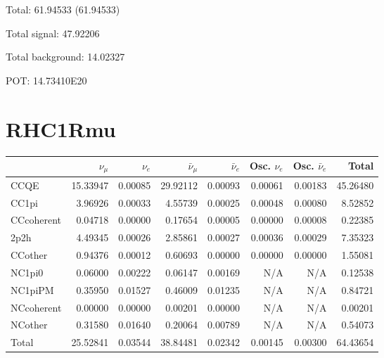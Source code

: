 \documentclass[10pt,a4paper]{article}
\begin{document}
Total: 61.94533    (61.94533)


Total signal: 47.92206


Total background: 14.02327

POT: 14.73410E20



\clearpage


\section*{RHC1Rmu}
\begin{tabular} { | l ||r | r | r | r | r | r | | r | }
\hline
              & $\nu_\mu$            & $\nu_e$              & $\bar{\nu}_{\mu}$    & $\bar{\nu}_{e}$      & Osc. $\nu_e$         & Osc. $\bar{\nu}_{e}$ & Total                \\ \hline\hline
 CCQE         & 15.33947             & 0.00085              & 29.92112             & 0.00093              & 0.00061              & 0.00183              & 45.26480             \\ \hline
 CC1pi        & 3.96926              & 0.00033              & 4.55739              & 0.00025              & 0.00048              & 0.00080              & 8.52852              \\ \hline
 CCcoherent   & 0.04718              & 0.00000              & 0.17654              & 0.00005              & 0.00000              & 0.00008              & 0.22385              \\ \hline
 2p2h         & 4.49345              & 0.00026              & 2.85861              & 0.00027              & 0.00036              & 0.00029              & 7.35323              \\ \hline
 CCother      & 0.94376              & 0.00012              & 0.60693              & 0.00000              & 0.00000              & 0.00000              & 1.55081              \\ \hline
 NC1pi0       & 0.06000              & 0.00222              & 0.06147              & 0.00169              & N/A                  & N/A                  & 0.12538              \\ \hline
 NC1piPM      & 0.35950              & 0.01527              & 0.46009              & 0.01235              & N/A                  & N/A                  & 0.84721              \\ \hline
 NCcoherent   & 0.00000              & 0.00000              & 0.00201              & 0.00000              & N/A                  & N/A                  & 0.00201              \\ \hline
 NCother      & 0.31580              & 0.01640              & 0.20064              & 0.00789              & N/A                  & N/A                  & 0.54073              \\ \hline
\hline
 Total        & 25.52841             & 0.03544              & 38.84481             & 0.02342              & 0.00145              & 0.00300              & 64.43654             \\ \hline

\end{tabular}
\end{document}
